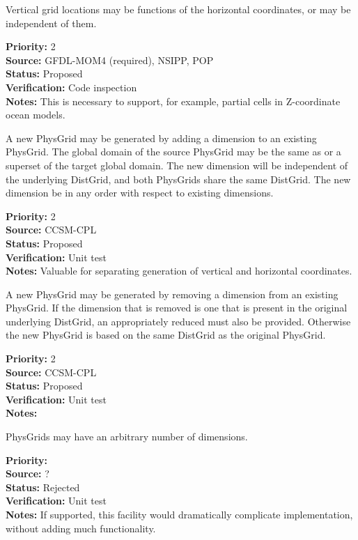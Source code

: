 Vertical grid locations may be functions of the horizontal coordinates, or may be
independent of them.
\begin{reqlist}
{\bf Priority:} 2 \\
{\bf Source:} GFDL-MOM4 (required), NSIPP, POP \\
{\bf Status:} Proposed \\
{\bf Verification:} Code inspection\\
{\bf Notes:} This is necessary to support, for example, partial cells in
Z-coordinate ocean models.
\end{reqlist}

A new PhysGrid may be generated by adding a dimension to an existing PhysGrid.
The global domain of the source PhysGrid may be the same as or a superset of
the target global domain.  The new dimension will be independent of the underlying
DistGrid, and both PhysGrids share the same DistGrid.  The new dimension be in any
order with respect to existing dimensions.
\begin{reqlist}
{\bf Priority:} 2 \\
{\bf Source:} CCSM-CPL \\
{\bf Status:} Proposed \\
{\bf Verification:} Unit test\\
{\bf Notes:} Valuable for separating generation of vertical and horizontal
coordinates.
\end{reqlist}

A new PhysGrid may be generated by removing a dimension from an existing PhysGrid.
If the dimension that is removed is one that is present in the original underlying
DistGrid, an appropriately reduced must also be provided.  Otherwise the new PhysGrid
is based on the same DistGrid as the original PhysGrid.
\begin{reqlist}
{\bf Priority:} 2 \\
{\bf Source:} CCSM-CPL \\
{\bf Status:} Proposed \\
{\bf Verification:} Unit test\\
{\bf Notes:} 
\end{reqlist}

PhysGrids may have an arbitrary number of dimensions. 
\begin{reqlist}
{\bf Priority:} \\
{\bf Source:} ? \\
{\bf Status:} Rejected\\
{\bf Verification:} Unit test\\
{\bf Notes:} If supported, this facility would dramatically complicate implementation,
without adding much functionality.
\end{reqlist}

